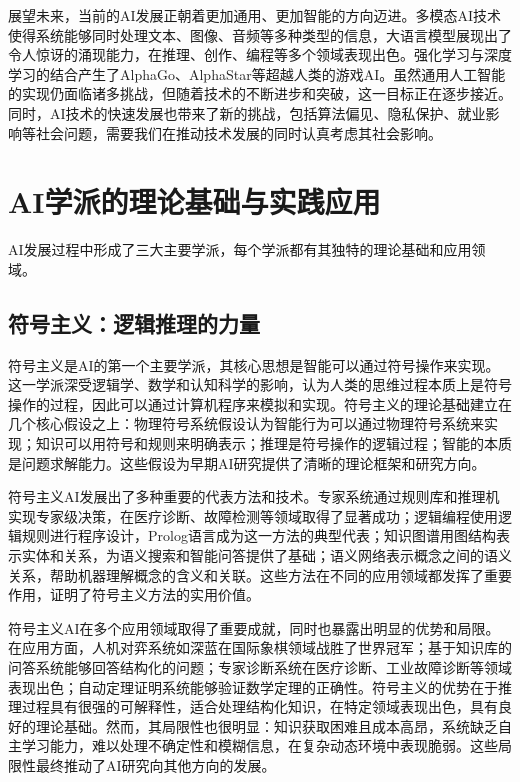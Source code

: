 展望未来，当前的AI发展正朝着更加通用、更加智能的方向迈进。多模态AI技术使得系统能够同时处理文本、图像、音频等多种类型的信息，大语言模型展现出了令人惊讶的涌现能力，在推理、创作、编程等多个领域表现出色。强化学习与深度学习的结合产生了AlphaGo、AlphaStar等超越人类的游戏AI。虽然通用人工智能的实现仍面临诸多挑战，但随着技术的不断进步和突破，这一目标正在逐步接近。同时，AI技术的快速发展也带来了新的挑战，包括算法偏见、隐私保护、就业影响等社会问题，需要我们在推动技术发展的同时认真考虑其社会影响。

\section{AI学派的理论基础与实践应用}

AI发展过程中形成了三大主要学派，每个学派都有其独特的理论基础和应用领域。

\subsection{符号主义：逻辑推理的力量}

符号主义是AI的第一个主要学派，其核心思想是智能可以通过符号操作来实现。这一学派深受逻辑学、数学和认知科学的影响，认为人类的思维过程本质上是符号操作的过程，因此可以通过计算机程序来模拟和实现。符号主义的理论基础建立在几个核心假设之上：物理符号系统假设认为智能行为可以通过物理符号系统来实现；知识可以用符号和规则来明确表示；推理是符号操作的逻辑过程；智能的本质是问题求解能力。这些假设为早期AI研究提供了清晰的理论框架和研究方向。

符号主义AI发展出了多种重要的代表方法和技术。专家系统通过规则库和推理机实现专家级决策，在医疗诊断、故障检测等领域取得了显著成功；逻辑编程使用逻辑规则进行程序设计，Prolog语言成为这一方法的典型代表；知识图谱用图结构表示实体和关系，为语义搜索和智能问答提供了基础；语义网络表示概念之间的语义关系，帮助机器理解概念的含义和关联。这些方法在不同的应用领域都发挥了重要作用，证明了符号主义方法的实用价值。

符号主义AI在多个应用领域取得了重要成就，同时也暴露出明显的优势和局限。在应用方面，人机对弈系统如深蓝在国际象棋领域战胜了世界冠军；基于知识库的问答系统能够回答结构化的问题；专家诊断系统在医疗诊断、工业故障诊断等领域表现出色；自动定理证明系统能够验证数学定理的正确性。符号主义的优势在于推理过程具有很强的可解释性，适合处理结构化知识，在特定领域表现出色，具有良好的理论基础。然而，其局限性也很明显：知识获取困难且成本高昂，系统缺乏自主学习能力，难以处理不确定性和模糊信息，在复杂动态环境中表现脆弱。这些局限性最终推动了AI研究向其他方向的发展。

